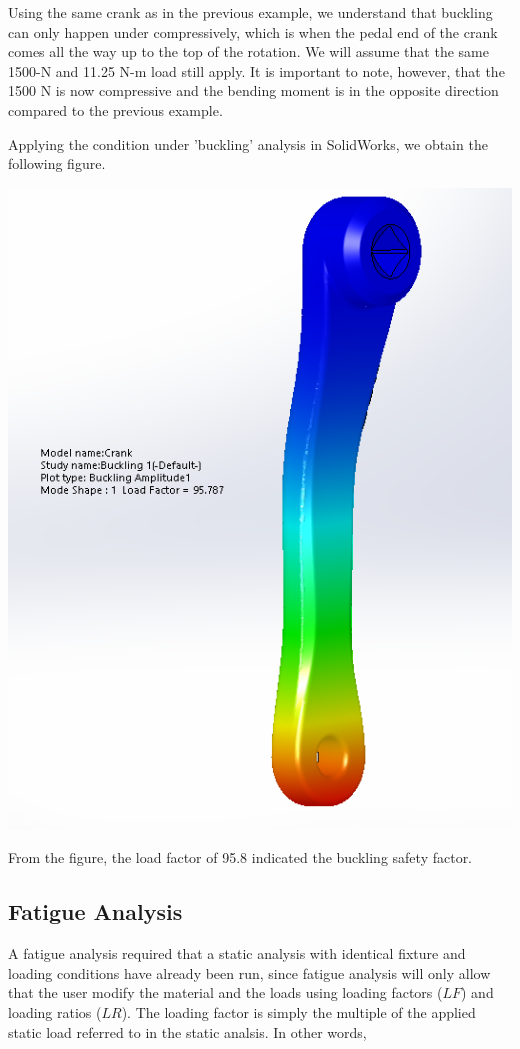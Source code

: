 \documentclass[a4paper,openany,12pt]{book}
\begin{document}
{{Using the same crank as in the previous example, we understand that
buckling can only happen under compressively, which is when the pedal
end of the crank comes all the way up to the top of the rotation. We
will assume that the same 1500-N and 11.25 N-m load still apply. It is
important to note, however, that the 1500 N is now compressive and the
bending moment is in the opposite direction compared to the previous
example.

Applying the condition under 'buckling' analysis in SolidWorks, we
obtain the following figure.


\begin{center}
\includegraphics[width=.9\linewidth]{pictures/Intro-CAD/Crank-buckling.png}
\end{center}

From the figure, the load factor of 95.8 indicated the buckling safety
factor.

\subsection{Fatigue Analysis}
\label{fatigue-analysis}
A fatigue analysis required that a static analysis with identical
fixture and loading conditions have already been run, since fatigue
analysis will only allow that the user modify the material and the loads
using loading factors (\(LF\)) and loading ratios (\(LR\)). The loading
factor is simply the multiple of the applied static load referred to in
the static analsis. In other words,

}}
\end{document}
